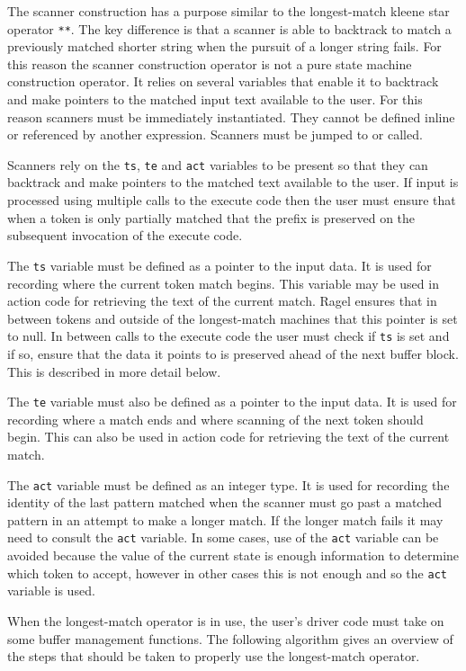 \documentclass[letterpaper,11pt,oneside]{book}
\begin{document}
The scanner construction has a purpose similar to the longest-match kleene star
operator \verb|**|. The key
difference is that a scanner is able to backtrack to match a previously matched
shorter string when the pursuit of a longer string fails.  For this reason the
scanner construction operator is not a pure state machine construction
operator. It relies on several variables that enable it to backtrack and make
pointers to the matched input text available to the user.  For this reason
scanners must be immediately instantiated. They cannot be defined inline or
referenced by another expression. Scanners must be jumped to or called.

Scanners rely on the \verb|ts|, \verb|te| and \verb|act|
variables to be present so that they can backtrack and make pointers to the
matched text available to the user. If input is processed using multiple calls
to the execute code then the user must ensure that when a token is only
partially matched that the prefix is preserved on the subsequent invocation of
the execute code.

The \verb|ts| variable must be defined as a pointer to the input data.
It is used for recording where the current token match begins. This variable
may be used in action code for retrieving the text of the current match.  Ragel
ensures that in between tokens and outside of the longest-match machines that
this pointer is set to null. In between calls to the execute code the user must
check if \verb|ts| is set and if so, ensure that the data it points to is
preserved ahead of the next buffer block. This is described in more detail
below.

The \verb|te| variable must also be defined as a pointer to the input data.
It is used for recording where a match ends and where scanning of the next
token should begin. This can also be used in action code for retrieving the
text of the current match.

The \verb|act| variable must be defined as an integer type. It is used for
recording the identity of the last pattern matched when the scanner must go
past a matched pattern in an attempt to make a longer match. If the longer
match fails it may need to consult the \verb|act| variable. In some cases, use 
of the \verb|act|
variable can be avoided because the value of the current state is enough
information to determine which token to accept, however in other cases this is
not enough and so the \verb|act| variable is used. 

When the longest-match operator is in use, the user's driver code must take on
some buffer management functions. The following algorithm gives an overview of
the steps that should be taken to properly use the longest-match operator.
\end{document}
